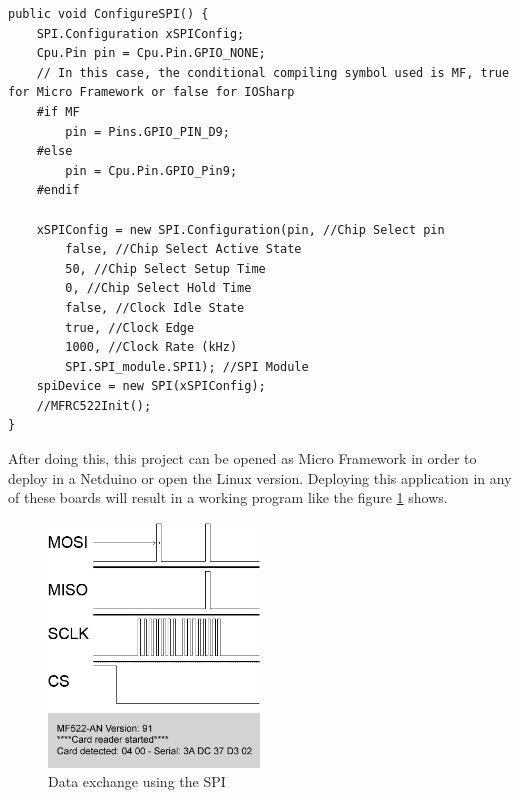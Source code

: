 \begin{lstlisting}[language=CSharp, caption={SPIApi.cs - Conditional compiling symbol for NETMF and IOSharp}]
public void ConfigureSPI() {
    SPI.Configuration xSPIConfig;
    Cpu.Pin pin = Cpu.Pin.GPIO_NONE;
  	// In this case, the conditional compiling symbol used is MF, true for Micro Framework or false for IOSharp
  	#if MF
    	pin = Pins.GPIO_PIN_D9;
    #else
        pin = Cpu.Pin.GPIO_Pin9;
    #endif

    xSPIConfig = new SPI.Configuration(pin, //Chip Select pin
        false, //Chip Select Active State
        50, //Chip Select Setup Time
        0, //Chip Select Hold Time
        false, //Clock Idle State
        true, //Clock Edge
        1000, //Clock Rate (kHz)
        SPI.SPI_module.SPI1); //SPI Module
    spiDevice = new SPI(xSPIConfig);
    //MFRC522Init();
}
\end{lstlisting}

After doing this, this project can be opened as Micro Framework in order to deploy in a Netduino or open the Linux version. Deploying this application in any of these boards will result in a working program like the figure \ref{fig:IOEx-SPI} shows.
\begin{figure}[H]\begin{center}
 \centering
  \captionsetup{justification=centering}
  \includegraphics[width=0.5\textwidth]{pictures/examples/rfid-spi}
  \caption{Data exchange using the SPI\label{fig:IOEx-SPI}}
\end{center}\end{figure}

